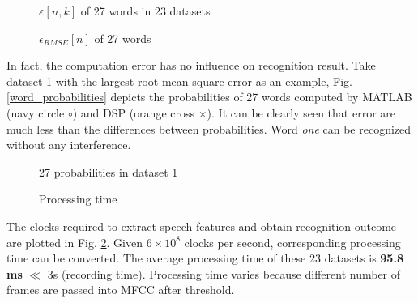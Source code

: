 \begin{figure}[H]
\begin{minipage}[t]{0.5\linewidth}
\centering
{}
\caption{$\varepsilon[n, k]$ of 27 words in 23 datasets}
\label{relative_error}
\end{minipage}
\begin{minipage}[t]{0.5\linewidth}
\centering
{}
\caption{$\epsilon_{RMSE}[n]$ of 27 words}
\label{root_mean_square_error}
\end{minipage}
\end{figure}

In fact, the computation error has no influence on recognition result. Take dataset 1 with the largest root mean square error as an example, Fig. \ref{word_probabilities} depicts the probabilities of 27 words computed by MATLAB (\textcolor{navy_matlab}{navy circle $\circ$}) and DSP (\textcolor{orange_matlab}{orange cross $\times$}). It can be clearly seen that error are much less than the differences between probabilities. Word \textit{one} can be recognized without any interference.

\begin{figure}[H]
\begin{minipage}[t]{0.5\linewidth}
\centering
{}
\caption{27 probabilities in dataset 1}
\label{word_probabilities}
\end{minipage}
\begin{minipage}[t]{0.5\linewidth}
\centering
{}
\caption{Processing time}
\label{processing_time}
\end{minipage}
\end{figure}

The clocks required to extract speech features and obtain recognition outcome are plotted in Fig. \ref{processing_time}. Given $6 \times 10^8$ clocks per second, corresponding processing time can be converted. The average processing time of these 23 datasets is \textbf{95.8 ms} $\ll$ 3s (recording time). Processing time varies because different number of frames are passed into MFCC after threshold.
